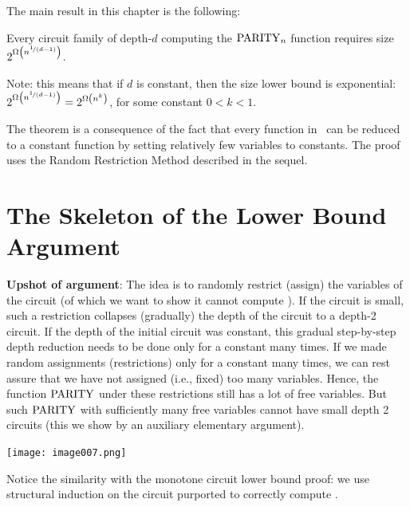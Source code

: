 The main result in this chapter is the following:


\begin{tcolorbox}[colframe=white, colback=blue!11, boxrule=0mm, sharp corners]
\begin{theorem}
\label{thm:ACZ-lower bound}
Every circuit family of depth-$d$ computing the $\operatorname{PARITY}_n$ function requires size $2^{\Omega\left(n^{\nicefrac{1}{(d-1)}}\right)}$.
\end{theorem}
\end{tcolorbox}



Note: this means that if $d$ is constant, then the size lower bound is exponential: $2^{\Omega\left(n^{\nicefrac{1}{(d-1)}}\right)}=
2^{\Omega\left(n^k\right)}$, for some constant $0<k<1$.

The theorem is a consequence of the fact that every function in \ACZ\ can be reduced to a constant function by setting relatively few variables to constants.
The proof uses the Random Restriction Method described in the sequel.

\section{The Skeleton of the Lower Bound Argument}



\begin{tcolorbox}[colframe=white, colback=gray!5, boxrule=0mm, sharp corners]
\textbf{Upshot of argument}: The idea is to randomly restrict (assign) the variables of the circuit (of which we want to show it cannot compute \Parity). If the circuit is small, such a restriction collapses (gradually) the depth of the circuit to a depth-2 circuit. If the depth of the initial circuit was constant, this gradual step-by-step depth reduction needs to be done only for a constant many times. If we made random assignments (restrictions) only for a constant many times, we can rest assure that we have not assigned (i.e., fixed) too many variables. Hence, the function $\operatorname{PARITY}$ under these restrictions still has a lot of free variables. But such $\operatorname{PARITY}$ with sufficiently many free variables cannot have small depth 2 circuits (this we show by an auxiliary elementary argument).
\end{tcolorbox}

\texttt{[image: image007.png]}


\begin{note} Notice the similarity with the monotone circuit lower bound proof: we use structural induction on the circuit purported to correctly compute \Parity. \end{note}


